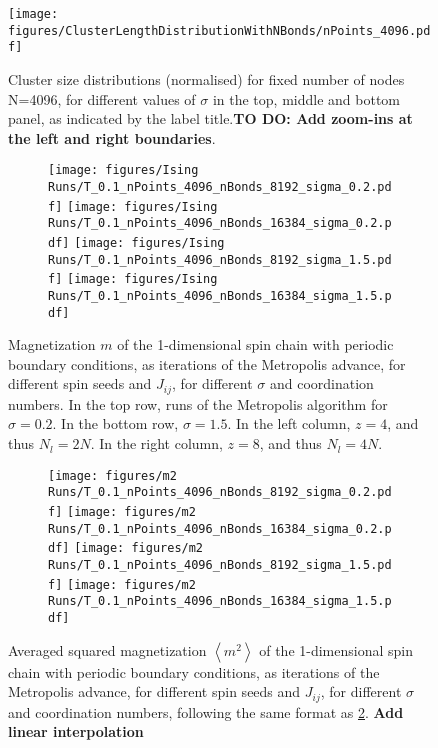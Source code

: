 \begin{figure}
		\centering
		\texttt{[image: figures/ClusterLengthDistributionWithNBonds/nPoints\_4096.pdf]}
	\caption{Cluster size distributions (normalised) for fixed number of nodes N=4096, for different values of $\sigma$ in the top, middle and bottom panel, as indicated by the label title.\textbf{TO DO: Add zoom-ins at the left and right boundaries}.}
	\label{fig:clusterLengthDistribution}
\end{figure}
\begin{figure}[p]
	\hspace{-2cm}
	\begin{subfigure}{1.3\textwidth}
	\texttt{[image: figures/Ising Runs/T\_0.1\_nPoints\_4096\_nBonds\_8192\_sigma\_0.2.pdf]}
	\texttt{[image: figures/Ising Runs/T\_0.1\_nPoints\_4096\_nBonds\_16384\_sigma\_0.2.pdf]}
	\texttt{[image: figures/Ising Runs/T\_0.1\_nPoints\_4096\_nBonds\_8192\_sigma\_1.5.pdf]}
	\texttt{[image: figures/Ising Runs/T\_0.1\_nPoints\_4096\_nBonds\_16384\_sigma\_1.5.pdf]}
	\end{subfigure}
	\caption{ Magnetization $m$ of the 1-dimensional spin chain with periodic boundary conditions, as iterations of the Metropolis advance, for different spin seeds and $J_{ij}$, for different $\sigma$ and coordination numbers. In the top row, runs of the Metropolis algorithm for $\sigma = 0.2$. In the bottom row, $\sigma = 1.5$. In the left column,  $z = 4$, and thus  $N_l = 2N$. In the right column,  $z = 8$, and thus $N_l = 4N$.}
	\label{fig:magnetization}
\end{figure}
\begin{figure}[p]
	\hspace{-2cm}
	\begin{subfigure}{1.3\textwidth}
	\texttt{[image: figures/m2 Runs/T\_0.1\_nPoints\_4096\_nBonds\_8192\_sigma\_0.2.pdf]}
	\texttt{[image: figures/m2 Runs/T\_0.1\_nPoints\_4096\_nBonds\_16384\_sigma\_0.2.pdf]}
	\texttt{[image: figures/m2 Runs/T\_0.1\_nPoints\_4096\_nBonds\_8192\_sigma\_1.5.pdf]}
	\texttt{[image: figures/m2 Runs/T\_0.1\_nPoints\_4096\_nBonds\_16384\_sigma\_1.5.pdf]}
	\end{subfigure}
	\caption{ Averaged squared magnetization $\left<m^2 \right>$ of the 1-dimensional spin chain with periodic boundary conditions, as iterations of the Metropolis advance, for different spin seeds and $J_{ij}$, for different $\sigma$ and coordination numbers, following the same format as \ref{fig:magnetization}. \textbf{Add linear interpolation}}
	\label{fig:m2}
\end{figure}

